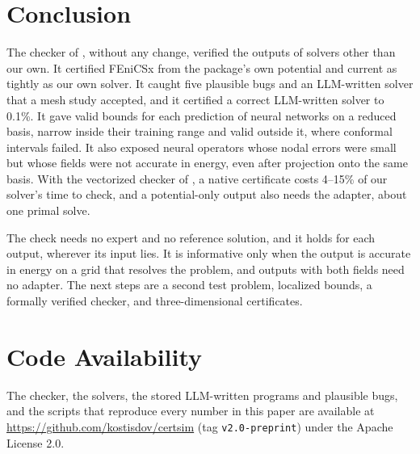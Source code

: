 \documentclass[11pt]{article}
\begin{document}
\section{Conclusion}
The checker of \cite{dovelos2026}, without any change, verified the outputs of
solvers other than our own. It certified FEniCSx from the package's own potential and
current as tightly as our own solver. It caught five
plausible bugs and an LLM-written solver that a mesh study accepted, and it certified
a correct LLM-written solver to 0.1\%. It gave valid bounds for each prediction of
neural networks on a reduced basis, narrow inside their training range and valid
outside it, where conformal intervals failed. It also exposed neural operators whose
nodal errors were small but whose fields were not accurate in energy, even after
projection onto the same basis. With the vectorized checker of \cite{dovelos2026},
a native certificate costs 4--15\% of our solver's time to check, and a
potential-only output also needs the adapter, about one primal solve.

The check needs no expert and no reference solution, and it holds for each output,
wherever its input lies. It is informative only when the output is accurate in energy
on a grid that resolves the problem, and outputs with both fields need no adapter. The next steps are a second test problem, localized bounds, a formally
verified checker, and three-dimensional certificates.

\section*{Code Availability}
The checker, the solvers, the stored LLM-written programs and plausible bugs, and
the scripts that reproduce every number in this paper are available at
\url{https://github.com/kostisdov/certsim} (tag \texttt{v2.0-preprint}) under the
Apache License 2.0.
\end{document}
